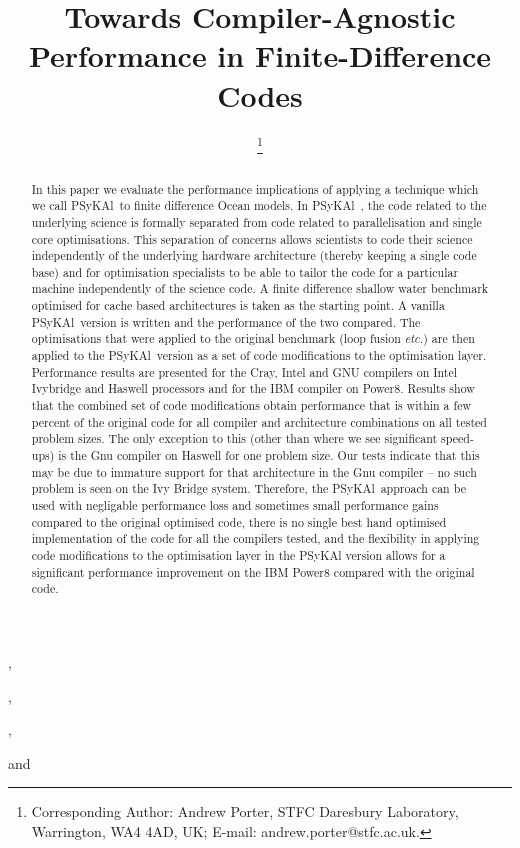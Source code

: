 \documentclass{IOS-Book-Article}
\newcommand{\psykal}{{PS}y{KA}l\ }
\begin{document}
\pagestyle{headings}
\def\thepage{}

\begin{frontmatter}              %
%
\title{Towards Compiler-Agnostic Performance in Finite-Difference Codes}

\author[A]{ %
\thanks{Corresponding Author: Andrew Porter, STFC Daresbury Laboratory, Warrington, WA4 4AD, UK; E-mail:
andrew.porter@stfc.ac.uk.}},
\author[A]{ },
\author[A]{ },
\author[B]{ }
and
\author[C]{ }
\address[A]{STFC Daresbury Laboratory, Warrington, WA4 4AD, UK}
\address[B]{The University of Manchester, UK}
\address[C]{STFC Hartree Centre}

\begin{abstract}
In this paper we evaluate the performance implications of applying a
technique which we call \psykal to finite difference Ocean models. 
%
In \psykal, the code related to the underlying science is formally
separated from code related to parallelisation and single core
optimisations. This separation of concerns allows scientists to code
their science independently of the underlying hardware architecture
(thereby keeping a single code base) and for optimisation specialists
to be able to tailor the code for a particular machine independently
of the science code.
%
A finite difference shallow water benchmark optimised for cache based
architectures is taken as the starting point. A vanilla \psykal version
is written and the performance of the two compared. The optimisations
that were applied to the original benchmark (loop fusion {\it etc.}) are then
applied to the \psykal version as a set of code modifications to the
optimisation layer. Performance results are presented for the Cray,
Intel and GNU compilers on Intel Ivybridge and Haswell processors and
for the IBM compiler on Power8.
%
Results show that the combined set of code modifications obtain
performance that is within a few percent of the original code for all
compiler and architecture combinations on all tested problem
sizes. The only exception to this (other than where we see significant
speed-ups) is the Gnu compiler on Haswell for one problem size. Our
tests indicate that this may be due to immature support for that
architecture in the Gnu compiler -- no such problem is seen on the Ivy
Bridge system.
Therefore, the \psykal approach can be used with negligable
performance loss and sometimes small performance gains compared to the
original optimised code, there is no single best hand optimised
implementation of the code for all the compilers tested, and the
flexibility in applying code modifications to the optimisation layer
in the PSyKAl version allows for a significant performance improvement
on the IBM Power8 compared with the original code.


\end{abstract}
\end{frontmatter}
\end{document}
